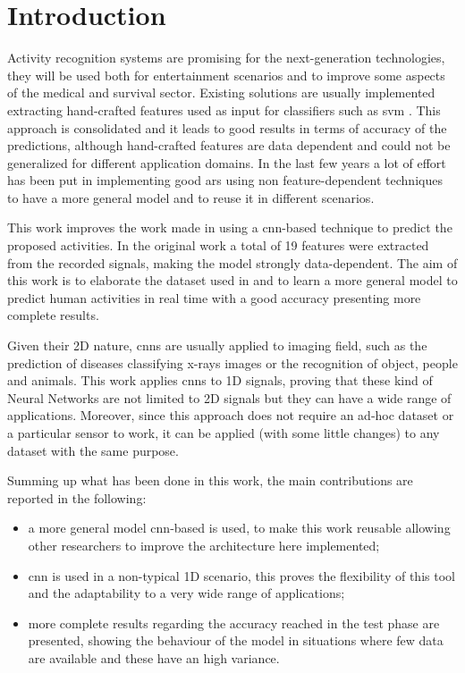 
\section{Introduction}
\label{sec:introduction}

Activity recognition systems are promising for the next-generation technologies, they will be used both for entertainment scenarios and to improve some aspects of the medical and survival sector.
Existing solutions are usually implemented extracting hand-crafted features used as input for classifiers such as \gls{svm} \cite{Elvira14, Hamalainen11, Khan10}.
This approach is consolidated and it leads to good results in terms of accuracy of the predictions, although hand-crafted features are data dependent and could not be generalized for different application domains.
In the last few years a lot of effort has been put in implementing good \gls{ars} using non feature-dependent techniques to have a more general model and to reuse it in different scenarios.

This work improves the work made in \cite{Frank10} using a \gls{cnn}-based technique to predict the proposed activities.
In the original work a total of 19 features were extracted from the recorded signals, making the model strongly data-dependent.
The aim of this work is to elaborate the dataset used in \cite{Frank10} and to learn a more general model to predict human activities in real time with a good accuracy presenting more complete results.

Given their 2D nature, \glspl{cnn} are usually applied to imaging field, such as the prediction of diseases classifying x-rays images or the recognition of object, people and animals.
This work applies \glspl{cnn} to 1D signals, proving that these kind of Neural Networks are not limited to 2D signals but they can have a wide range of applications.
Moreover, since this approach does not require an ad-hoc dataset or a particular sensor to work, it can be applied (with some little changes) to any dataset with the same purpose.

Summing up what has been done in this work, the main contributions are reported in the following:
\begin{itemize}
\item a more general model \gls{cnn}-based is used, to make this work reusable allowing other researchers to improve the architecture here implemented;
\item \gls{cnn} is used in a non-typical 1D scenario, this proves the flexibility of this tool and the adaptability to a very wide range of applications;
\item more complete results regarding the accuracy reached in the test phase are presented, showing the behaviour of the model in situations where few data are available and these have an high variance.
\end{itemize}

